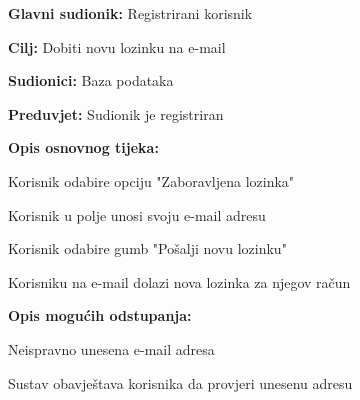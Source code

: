 		\noindent {}
		\begin{packed_item}
			
			\item \textbf{Glavni sudionik: }Registrirani korisnik
			\item  \textbf{Cilj:} Dobiti novu lozinku na e-mail
			\item  \textbf{Sudionici:} Baza podataka
			\item  \textbf{Preduvjet:} Sudionik je registriran
			\item  \textbf{Opis osnovnog tijeka:}
			
			\item[] \begin{packed_enum}
				
				\item Korisnik odabire opciju "Zaboravljena lozinka"
				\item Korisnik u polje unosi svoju e-mail adresu
				\item Korisnik odabire gumb "Pošalji novu lozinku"
				\item Korisniku na e-mail dolazi nova lozinka za njegov račun
				
			\end{packed_enum}
			
			\item  \textbf{Opis mogućih odstupanja:}
			
			\item[] \begin{packed_item}
				
				\item[2.a] Neispravno unesena e-mail adresa
				
				\item[] \begin{packed_enum}
					
					\item Sustav obavještava korisnika da provjeri unesenu adresu
					
				\end{packed_enum}
			\end{packed_item}
		\end{packed_item}
	
